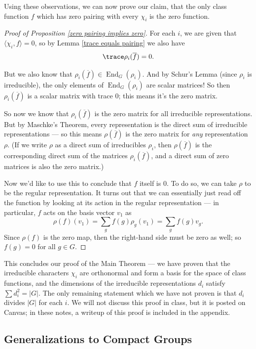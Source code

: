 Using these observations, we can now prove our claim, that the only class function $f$ which has zero pairing with every $\chi_i$ is the zero function. 

\begin{proof}[Proof of Proposition \ref{zero pairing implies zero}]
    For each $i$, we are given that $\langle \chi_i, f\rangle = 0$, so by Lemma \ref{trace equals pairing} we also have \[\trace \rho_i(\overline{f}) = 0.\]
    
    But we also know that $\rho_i(\overline{f}) \in \operatorname{End}_G(\rho_i)$. And by Schur's Lemma (since $\rho_i$ is irreducible), the only elements of $\operatorname{End}_G(\rho_i)$ are scalar matrices! So then $\rho_i(\overline{f})$ is a scalar matrix with trace $0$; this means it's the zero matrix. 
    
    So now we know that $\rho_i(\overline{f})$ is the zero matrix for all irreducible representations. But by Maschke's Theorem, every representation is the direct sum of irreducible representations --- so this means $\rho(\overline{f})$ is the zero matrix for \emph{any} representation $\rho$. (If we write $\rho$ as a direct sum of irreducibles $\rho_i$, then $\rho(\overline{f})$ is the corresponding direct sum of the matrices $\rho_i(\overline{f})$, and a direct sum of zero matrices is also the zero matrix.) 
    
    Now we'd like to use this to conclude that $f$ itself is $0$. To do so, we can take $\rho$ to be the regular representation. It turns out that we can essentially just read off the function by looking at its action in the regular representation --- in particular, $f$ acts on the basis vector $v_1$ as \[\rho(f)(v_1) = \sum_g f(g)\rho_g(v_1) = \sum_g f(g)v_g.\] Since $\rho(f)$ is the zero map, then the right-hand side must be zero as well; so $f(g) = 0$ for all $g \in G$. 
\end{proof}

This concludes our proof of the Main Theorem --- we have proven that the irreducible characters $\chi_i$ are orthonormal and form a basis for the space of class functions, and the dimensions of the irreducible representations $d_i$ satisfy $\sum d_i^2 = |G|$. The only remaining statement which we have not proven is that $d_i$ divides $|G|$ for each $i$. We will not discuss this proof in class, but it is posted on Canvas; in these notes, a writeup of this proof is included in the appendix. 

\subsection{Generalizations to Compact Groups}

